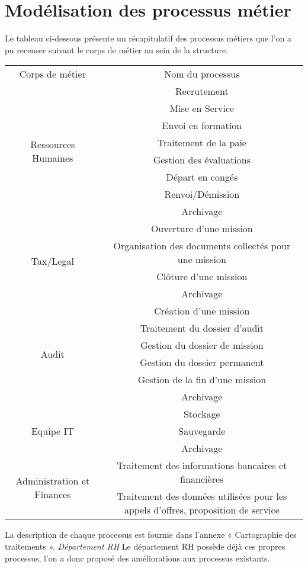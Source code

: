 \section{Modélisation des processus métier}
Le tableau ci-dessous présente un récapitulatif des processus métiers que l’on a pu recenser suivant le corps de métier au sein de la structure.
\begin{center}
    \begin{tabular}{|c|c|}
        \hline
         Corps de métier & Nom du processus  \\
         \multirow{8}{4em}{Ressources Humaines} & Recrutement \\
         &Mise en Service \\
         & Envoi en formation \\
         & Traitement de la paie \\
         & Gestion des évaluations \\
         & Départ en congés \\
         & Renvoi/Démission \\
         & Archivage \\
         \hline
         \multirow{4}{2em}{Tax/Legal} & Ouverture d'une mission \\
         & Organisation des documents collectés pour une mission \\
         & Clôture d’une mission \\
         & Archivage \\
         \hline
         \multirow{6}{2em}{Audit} & Création d'une mission \\
         & Traitement du dossier d’audit \\
         & Gestion du dossier de mission \\
         & Gestion du dossier permanent \\
         & Gestion de la fin d’une mission \\
         & Archivage \\
         \hline
         \multirow{3}{2em}{Equipe IT} & Stockage \\
         & Sauvegarde \\
         & Archivage \\
         \hline
         \multirow{2}{2em}{Administration et Finances}
         & Traitement des informations bancaires et financières \\
         \hline
         Business Development & Traitement des données utilisées pour les appels d’offres, proposition de service \\
    \end{tabular}
\end{center}
La description de chaque processus est fournie dans l’annexe « Cartographie des traitements ».
\textit{Département RH}
Le département RH possède déjà ces propres processus, l'on a donc proposé des améliorations aux processus existants.

